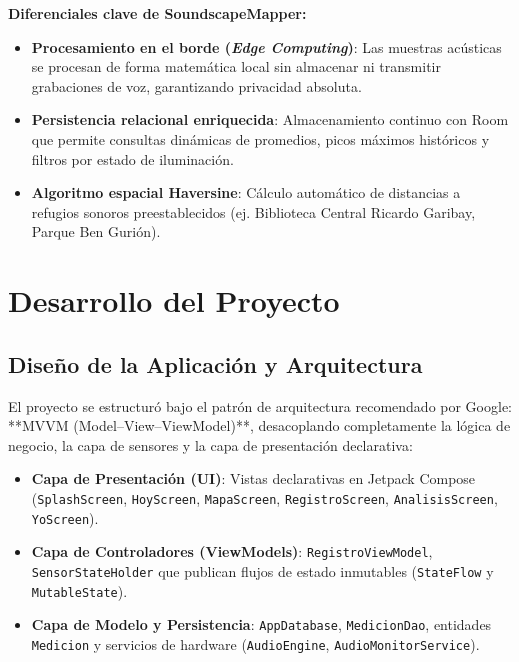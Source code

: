 \documentclass[12pt,a4paper]{article}
\begin{document}
\textbf{Diferenciales clave de SoundscapeMapper:}
\begin{itemize}[leftmargin=*]
    \item \textbf{Procesamiento en el borde (\textit{Edge Computing})}: Las muestras acústicas se procesan de forma matemática local sin almacenar ni transmitir grabaciones de voz, garantizando privacidad absoluta.
    \item \textbf{Persistencia relacional enriquecida}: Almacenamiento continuo con Room que permite consultas dinámicas de promedios, picos máximos históricos y filtros por estado de iluminación.
    \item \textbf{Algoritmo espacial Haversine}: Cálculo automático de distancias a refugios sonoros preestablecidos (ej. Biblioteca Central Ricardo Garibay, Parque Ben Gurión).
\end{itemize}

\section{Desarrollo del Proyecto}

\subsection{Diseño de la Aplicación y Arquitectura}

El proyecto se estructuró bajo el patrón de arquitectura recomendado por Google: **MVVM (Model--View--ViewModel)**, desacoplando completamente la lógica de negocio, la capa de sensores y la capa de presentación declarativa:

\begin{itemize}[leftmargin=*]
    \item \textbf{Capa de Presentación (UI)}: Vistas declarativas en Jetpack Compose (\texttt{SplashScreen}, \texttt{HoyScreen}, \texttt{MapaScreen}, \texttt{RegistroScreen}, \texttt{AnalisisScreen}, \texttt{YoScreen}).
    \item \textbf{Capa de Controladores (ViewModels)}: \texttt{RegistroViewModel}, \texttt{SensorStateHolder} que publican flujos de estado inmutables (\texttt{StateFlow} y \texttt{MutableState}).
    \item \textbf{Capa de Modelo y Persistencia}: \texttt{AppDatabase}, \texttt{MedicionDao}, entidades \texttt{Medicion} y servicios de hardware (\texttt{AudioEngine}, \texttt{AudioMonitorService}).
\end{itemize}
\end{document}

